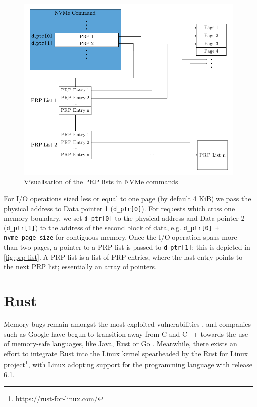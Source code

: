 \begin{figure}[]
  \centering
    \includegraphics[width=\textwidth]{figures/prp-list}
    \caption{Visualisation of the PRP lists in NVMe commands}
    \label{fig:prp-list}
\end{figure}

For I/O operations sized less or equal to one page (by default 4 KiB) we pass the physical address to Data pointer 1 (\texttt{d\_ptr[0]}). For requests which cross one memory boundary, we set \texttt{d\_ptr[0]} to the physical address and Data pointer 2 (\texttt{d\_ptr[1]}) to the address of the second block of data, e.g. \texttt{d\_ptr[0] + nvme\_page\_size} for contiguous memory. Once the I/O operation spans more than two pages, a pointer to a PRP list is passed to \texttt{d\_ptr[1]}; this is depicted in \autoref{fig:prp-list}. A PRP list is a list of PRP entries, where the last entry points to the next PRP list; essentially an array of pointers.

\section{Rust}
Memory bugs remain amongst the most exploited vulnerabilities \cite{mitre}, and companies such as Google have begun to transition away from C and C++ towards the use of memory-safe languages, like Java, Rust or Go \cite{google}. Meanwhile, there exists an effort to integrate Rust into the Linux kernel spearheaded by the Rust for Linux project\footnote{\url{https://rust-for-linux.com/}}, with Linux adopting support for the programming language with release 6.1.

